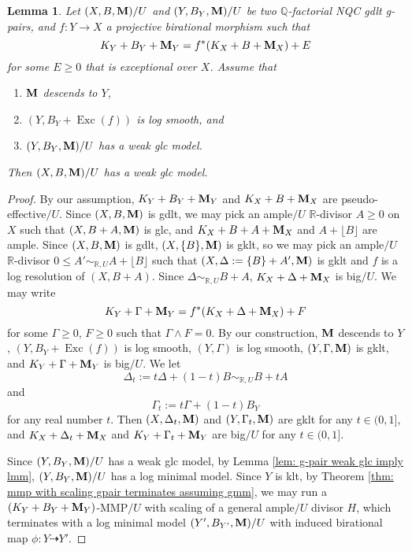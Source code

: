 \documentclass[11pt]{amsart}
\numberwithin{equation}{section}
\newcommand{\Mm}{{\bf{M}}}
\newcommand{\Qq}{\mathbb{Q}}
\newcommand{\Rr}{\mathbb{R}}
\newcommand{\Exc}{\operatorname{Exc}}
\newtheorem{lem}[thm]{Lemma}
\theoremstyle{definition}
\theoremstyle{definition}
\theoremstyle{definition}
\begin{document}
\begin{lem}\label{lem: existence good minimal model under pullbacks weak glc case}
Let $(X,B,\Mm)/U$ and $(Y,B_Y,\Mm)/U$ be two $\Qq$-factorial NQC gdlt g-pairs, and $f: Y\rightarrow X$ a projective birational morphism such that
$$K_Y+B_Y+\Mm_Y=f^*(K_X+B+\Mm_X)+E$$
for some $E\geq 0$ that is exceptional over $X$. Assume that
\begin{enumerate}
\item $\Mm$ descends to $Y$,
\item $(Y,B_Y+\Exc(f))$ is log smooth, and
\item $(Y,B_Y,\Mm)/U$ has a weak glc model.
\end{enumerate}
Then $(X,B,\Mm)/U$ has a weak glc model.
\end{lem}
\begin{proof}
By our assumption, $K_Y+B_Y+\Mm_Y$ and $K_X+B+\Mm_X$ are pseudo-effective$/U$. Since $(X,B,\Mm)$ is gdlt, we may pick an ample$/U$ $\Rr$-divisor $A\geq 0$ on $X$ such that $(X,B+A,\Mm)$ is glc, and $K_X+B+A+\Mm_X$ and $A+\lfloor B\rfloor$ are ample. Since $(X,B,\Mm)$ is gdlt, $(X,\{B\},\Mm)$ is gklt, so we may pick an ample$/U$ $\Rr$-divisor $0\leq A'\sim_{\mathbb R,U}A+\lfloor B\rfloor$ such that $(X,\Delta:=\{B\}+A',\Mm)$ is gklt and $f$ is a log resolution of $(X,B+A)$. Since $\Delta\sim_{\Rr,U}B+A$, $K_X+\Delta+\Mm_X$ is big$/U$. We may write
$$K_Y+\Gamma+\Mm_Y=f^*(K_X+\Delta+\Mm_X)+F$$
for some $\Gamma\geq 0$, $F\geq 0$ such that $\Gamma\wedge F=0$. By our construction, $\Mm$ descends to $Y$, $(Y,B_Y+\Exc(f))$ is log smooth, $(Y,\Gamma)$ is log smooth, $(Y,\Gamma,\Mm)$ is gklt, and $K_Y+\Gamma+\Mm_Y$ is big$/U$. We let
$$\Delta_t:=t\Delta+(1-t)B\sim_{\mathbb R,U}B+tA$$
and
$$\Gamma_t:=t\Gamma+(1-t)B_Y$$
for any real number $t$. Then $(X,\Delta_t,\Mm)$ and $(Y,\Gamma_t,\Mm)$ are gklt for any $t\in (0,1]$, and $K_X+\Delta_t+\Mm_X$ and $K_Y+\Gamma_t+\Mm_Y$ are big$/U$ for any $t\in (0,1]$. 



Since $(Y,B_Y,\Mm)/U$ has a weak glc model, by Lemma \ref{lem: g-pair weak glc imply lmm},  $(Y,B_Y,\Mm)/U$ has a log minimal model. Since $Y$ is klt, by Theorem \ref{thm: mmp with scaling gpair terminates assuming gmm}, we may run a $(K_Y+B_Y+\Mm_Y)$-MMP$/U$ with scaling of a general ample$/U$ divisor $H$, which terminates with a log minimal model $(Y',B_{Y'},\Mm)/U$ with induced birational map $\phi: Y\dashrightarrow Y'$. 


\end{proof}
\end{document}
